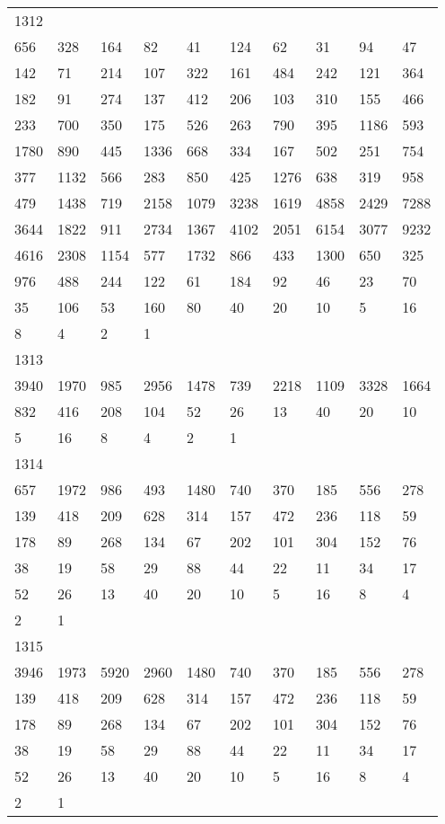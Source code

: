 \begin{longtable}{*{10}{l}}
1312&&&&&&&&&\\
656& 328& 164& 82& 41& 124& 62& 31& 94& 47\\
142& 71& 214& 107& 322& 161& 484& 242& 121& 364\\
182& 91& 274& 137& 412& 206& 103& 310& 155& 466\\
233& 700& 350& 175& 526& 263& 790& 395& 1186& 593\\
1780& 890& 445& 1336& 668& 334& 167& 502& 251& 754\\
377& 1132& 566& 283& 850& 425& 1276& 638& 319& 958\\
479& 1438& 719& 2158& 1079& 3238& 1619& 4858& 2429& 7288\\
3644& 1822& 911& 2734& 1367& 4102& 2051& 6154& 3077& 9232\\
4616& 2308& 1154& 577& 1732& 866& 433& 1300& 650& 325\\
976& 488& 244& 122& 61& 184& 92& 46& 23& 70\\
35& 106& 53& 160& 80& 40& 20& 10& 5& 16\\
8& 4& 2& 1& \\

1313&&&&&&&&&\\
3940& 1970& 985& 2956& 1478& 739& 2218& 1109& 3328& 1664\\
832& 416& 208& 104& 52& 26& 13& 40& 20& 10\\
5& 16& 8& 4& 2& 1& \\

1314&&&&&&&&&\\
657& 1972& 986& 493& 1480& 740& 370& 185& 556& 278\\
139& 418& 209& 628& 314& 157& 472& 236& 118& 59\\
178& 89& 268& 134& 67& 202& 101& 304& 152& 76\\
38& 19& 58& 29& 88& 44& 22& 11& 34& 17\\
52& 26& 13& 40& 20& 10& 5& 16& 8& 4\\
2& 1& \\

1315&&&&&&&&&\\
3946& 1973& 5920& 2960& 1480& 740& 370& 185& 556& 278\\
139& 418& 209& 628& 314& 157& 472& 236& 118& 59\\
178& 89& 268& 134& 67& 202& 101& 304& 152& 76\\
38& 19& 58& 29& 88& 44& 22& 11& 34& 17\\
52& 26& 13& 40& 20& 10& 5& 16& 8& 4\\
2& 1& \\


\end{longtable}
